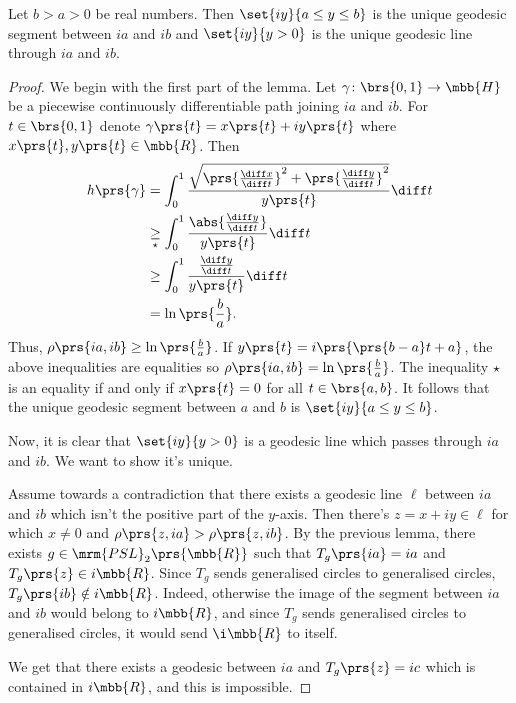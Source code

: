 \documentclass[10pt, twoside]{book}
\begin{document}
\begin{lemma}
Let $b > a > 0$ be real numbers. Then $\set{iy}{a \leq y \leq b}$ is the unique geodesic segment between $ia$ and $ib$ and $\set{iy}{y > 0}$ is the unique geodesic line through $ia$ and $ib$.
\end{lemma}

\begin{proof}
We begin with the first part of the lemma.
Let $\gamma \colon \brs{0,1} \to \mbb{H}$ be a piecewise continuously differentiable path joining $ia$ and $ib$. For $t \in \brs{0,1}$ denote $\gamma\prs{t} = x\prs{t} + iy\prs{t}$ where $x\prs{t},y\prs{t} \in \mbb{R}$.
Then
\begin{align*}
h\prs{\gamma} &= \int_0^1 \frac{\sqrt{\prs{\frac{\diff x}{\diff t}}^2 + \prs{\frac{\diff y}{\diff t}}^2}}{y\prs{t}} \diff t
\\&\underset{\star}{\geq}
\int_0^1 \frac{\abs{\frac{\diff y}{\diff t}}}{y\prs{t}} \diff t
\\&\geq
\int_0^1 \frac{\frac{\diff y}{\diff t}}{y\prs{t}} \diff t
\\&=
\ln\prs{\frac{b}{a}} \text{.}
\end{align*}
Thus, $\rho\prs{ia, ib} \geq \ln\prs{\frac{b}{a}}$. If $y\prs{t} = i\prs{\prs{b-a}t + a}$, the above inequalities are equalities so $\rho\prs{ia, ib} = \ln\prs{\frac{b}{a}}$. The inequality $\star$ is an equality if and only if $x\prs{t} = 0$ for all $t \in \brs{a,b}$. It follows that the unique geodesic segment between $a$ and $b$ is $\set{iy}{a \leq y \leq b}$.

Now, it is clear that $\set{iy}{y > 0}$ is a geodesic line which passes through $ia$ and $ib$.
We want to show it's unique.

Assume towards a contradiction that there exists a geodesic line $\ell$ between $ia$ and $ib$ which isn't the positive part of the $y$-axis.
Then there's $z = x + iy \in \ell$ for which $x \neq 0$ and $\rho\prs{z, ia} > \rho\prs{z, ib}$. By the previous lemma, there exists $g \in \mrm{PSL}_2\prs{\mbb{R}}$ such that $T_g\prs{ia} = ia$ and $T_g\prs{z} \in i \mbb{R}$. Since $T_g$ sends generalised circles to generalised circles, $T_g\prs{ib} \notin i \mbb{R}$. Indeed, otherwise the image of the segment between $ia$ and $ib$ would belong to $i \mbb{R}$, and since $T_g$ sends generalised circles to generalised circles, it would send $\i\mbb{R}$ to itself.

We get that there exists a geodesic between $ia$ and $T_g\prs{z} = ic$ which is contained in $i\mbb{R}$, and this is impossible.
\end{proof}
\end{document}
